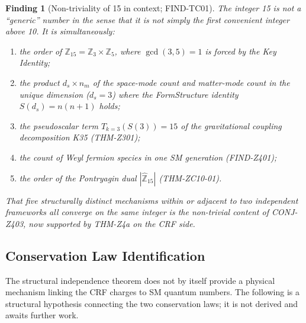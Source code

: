 \documentclass[12pt, a4paper]{article}
\newtheorem{finding}{Finding}[section]
\begin{document}
\begin{finding}[Non-triviality of 15 in context; FIND-TC01]
\label{find:nontrivial}
The integer 15 is not a ``generic'' number in the sense that it
is not simply the first convenient integer above 10. It is
simultaneously:
\begin{enumerate}[leftmargin=*, noitemsep]
  \item the order of $\mathbb{Z}_{15} = \mathbb{Z}_3 \times \mathbb{Z}_5$,
    where $\gcd(3,5)=1$ is forced by the Key Identity;
  \item the product $d_s \times n_m$ of the space-mode count and
    matter-mode count in the unique dimension ($d_s = 3$) where
    the FormStructure identity $S(d_s) = n(n+1)$ holds;
  \item the pseudoscalar term $T_{k=3}(S(3)) = 15$ of the
    gravitational coupling decomposition K35 (THM-Z301);
  \item the count of Weyl fermion species in one SM generation
    (FIND-Z401);
  \item the order of the Pontryagin dual $|\hat{\mathbb{Z}}_{15}|$
    (THM-ZC10-01).
\end{enumerate}
That five structurally distinct mechanisms within or adjacent to two
independent frameworks all converge on the same integer is the
non-trivial content of CONJ-Z403, now supported by THM-Z4a on the
CRF side.
\end{finding}

\subsection{Conservation Law Identification}
\label{sec:conservation}

The structural independence theorem does not by itself provide a
physical mechanism linking the CRF charges to SM quantum numbers.
The following is a structural hypothesis connecting the two
conservation laws; it is not derived and awaits further work.
\end{document}
